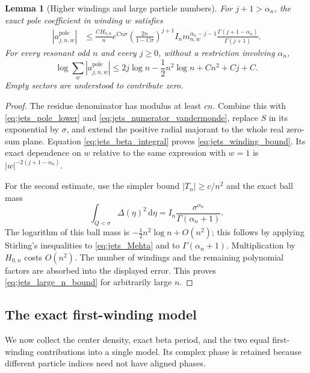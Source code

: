 \documentclass[11pt]{article}
\numberwithin{equation}{section}
\newtheorem{lemma}[theorem]{Lemma}
\theoremstyle{definition}
\newcommand{\dd}{\,\mathrm d}
\begin{document}
\begin{lemma}[Higher windings and large particle numbers]
\label{lem:jets_windings_large_n}
For $j+1>\alpha_n$, the exact pole coefficient in winding $w$
satisfies
\begin{align}
 |a_{j,n,w}^{\mathrm{pole}}|
 &\le \frac{C H_{0,n}}n e^{Cn\sigma}
 \left(\frac{2n}{1-C\sigma}\right)^{j+1}
 I_n m_{n,w}^{\alpha_n-j-1}
 \frac{\Gamma(j+1-\alpha_n)}{\Gamma(j+1)}.
 \label{eq:jets_winding_bound}
\end{align}
For every resonant odd $n$ and every $j\ge0$, without a restriction
involving $\alpha_n$,
\begin{equation}\label{eq:jets_large_n_bound}
 \log\sum_w|a_{j,n,w}^{\mathrm{pole}}|
 \le 2j\log n-\frac12n^2\log n+Cn^2+Cj+C.
\end{equation}
Empty sectors are understood to contribute zero.
\end{lemma}

\begin{proof}
The residue denominator has modulus at least $cn$. Combine this
with \eqref{eq:jets_pole_lower} and
\eqref{eq:jets_numerator_vandermonde}, replace $S$ in its exponential
by $\sigma$, and extend the positive radial majorant to the whole
real zero-sum plane. Equation \eqref{eq:jets_beta_integral} proves
\eqref{eq:jets_winding_bound}. Its exact dependence on $w$ relative
to the same expression with $w=1$ is
$|w|^{-2(j+1-\alpha_n)}$.

For the second estimate, use the simpler bound $|T_n|\ge c/n^2$
and the exact ball mass
\[
 \int_{Q<\sigma}\Delta(\eta)^2\dd\eta
 =I_n\frac{\sigma^{\alpha_n}}{\Gamma(\alpha_n+1)}.
\]
The logarithm of this ball mass is
$-\tfrac12n^2\log n+O(n^2)$; this follows by applying Stirling's
inequalities to \eqref{eq:jets_Mehta} and to
$\Gamma(\alpha_n+1)$. Multiplication by $H_{0,n}$ costs $O(n^2)$.
The number of windings and the remaining polynomial factors are
absorbed into the displayed error. This proves
\eqref{eq:jets_large_n_bound} for arbitrarily large $n$.
\end{proof}

\subsection{The exact first-winding model}

We now collect the center density, exact beta period, and the two equal
first-winding contributions into a single model. Its complex phase is
retained because different particle indices need not have aligned phases.
\end{document}
